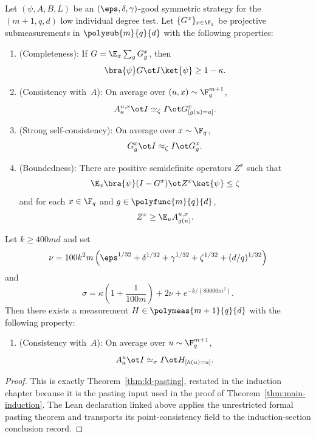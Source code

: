 \begin{theorem}[Pasting]\label{thm:ld-pasting-in-induction-section}
  \leanok
  Let $(\psi,A,B,L)$ be an $(\eps,\delta,\gamma)$-good symmetric strategy for the $(m+1,q,d)$ low individual degree test. Let $\{G^x\}_{x \in \F_q}$ be projective submeasurements in $\polysub{m}{q}{d}$ with the following properties:
  \begin{enumerate}
    \item (Completeness): \label{item:ld-pasting-inductive-completeness} If $G=\E_x \sum_g G_g^x$, then
    \[
      \bra{\psi} G \ot I \ket{\psi} \ge 1-\kappa.
    \]
    \item (Consistency with~$A$): \label{item:ld-pasting-inductive-consistency} On average over $(u,x) \sim \F_q^{m+1}$,
    \[
      A_a^{u,x} \ot I \simeq_\zeta I \ot G_{[g(u)=a]}^x.
    \]
    \item (Strong self-consistency): \label{item:ld-pasting-inductive-self-consistency} On average over $x \sim \F_q$,
    \[
      G_g^x \ot I \approx_\zeta I \ot G_g^x.
    \]
    \item (Boundedness): \label{item:ld-pasting-inductive-boundedness} There are positive semidefinite operators $Z^x$ such that
    \[
      \E_x \bra{\psi} (I-G^x) \ot Z^x \ket{\psi} \le \zeta
    \]
    and for each $x \in \F_q$ and $g \in \polyfunc{m}{q}{d}$,
    \[
      Z^x \ge \E_u A_{g(u)}^{u,x}.
    \]
  \end{enumerate}
  Let $k \ge 400md$ and set
  \[
    \nu = 100k^2m\left(\eps^{1/32}+\delta^{1/32}+\gamma^{1/32}+\zeta^{1/32}+(d/q)^{1/32}\right)
  \]
  and
  \[
    \sigma = \kappa\left(1+\frac{1}{100m}\right) + 2\nu + e^{-k/(80000m^2)}.
  \]
  Then there exists a measurement $H \in \polymeas{m+1}{q}{d}$ with the following property:
  \begin{enumerate}
    \item (Consistency with~$A$): \label{item:ld-pasting-inductive-N-consistency} On average over $u \sim \F_q^{m+1}$,
    \[
      A_a^u \ot I \simeq_\sigma I \ot H_{[h(u)=a]}.
    \]
  \end{enumerate}
\end{theorem}
\begin{proof}
	\leanok
	This is exactly Theorem~\ref{thm:ld-pasting}, restated in the induction chapter
	because it is the pasting input used in the proof of
	Theorem~\ref{thm:main-induction}.  The Lean declaration linked above applies
	the unrestricted formal pasting theorem and transports its point-consistency
	field to the induction-section conclusion record.
\end{proof}

